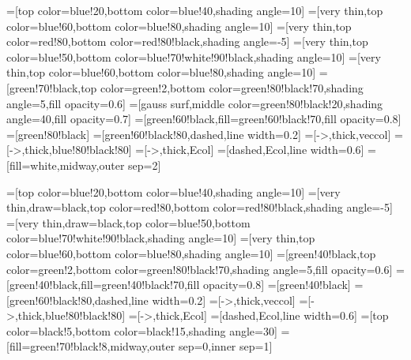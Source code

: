 \usepackage{xcolor}
=[top color=blue!20,bottom color=blue!40,shading angle=10]
=[very thin,top color=blue!60,bottom color=blue!80,shading angle=10]
=[very thin,top color=red!80,bottom color=red!80!black,shading angle=-5]
=[very thin,top color=blue!50,bottom color=blue!70!white!90!black,shading angle=10]
=[very thin,top color=blue!60,bottom color=blue!80,shading angle=10]
=[green!70!black,top color=green!2,bottom color=green!80!black!70,shading angle=5,fill opacity=0.6]
=[gauss surf,middle color=green!80!black!20,shading angle=40,fill opacity=0.7]
=[green!60!black,fill=green!60!black!70,fill opacity=0.8]
=[green!80!black]
=[green!60!black!80,dashed,line width=0.2]
=[->,thick,veccol]
=[->,thick,blue!80!black!80]
=[->,thick,Ecol]
=[dashed,Ecol,line width=0.6]
=[fill=white,midway,outer sep=2]

\usepackage[outline]{contour} %
\usetikzlibrary{angles,quotes} %
\usetikzlibrary{decorations.markings}
\usetikzlibrary{shapes,intersections} %
\tikzset{>=latex} %
\contourlength{1.8pt}

\usepackage{xcolor}
=[top color=blue!20,bottom color=blue!40,shading angle=10]
=[very thin,draw=black,top color=red!80,bottom color=red!80!black,shading angle=-5]
=[very thin,draw=black,top color=blue!50,bottom color=blue!70!white!90!black,shading angle=10]
=[very thin,top color=blue!60,bottom color=blue!80,shading angle=10]
=[green!40!black,top color=green!2,bottom color=green!80!black!70,shading angle=5,fill opacity=0.6]
=[green!40!black,fill=green!40!black!70,fill opacity=0.8]
=[green!40!black]
=[green!60!black!80,dashed,line width=0.2]
=[->,thick,veccol]
=[->,thick,blue!80!black!80]
=[->,thick,Ecol]
=[dashed,Ecol,line width=0.6]
=[top color=black!5,bottom color=black!15,shading angle=30]
=[fill=green!70!black!8,midway,outer sep=0,inner sep=1]


